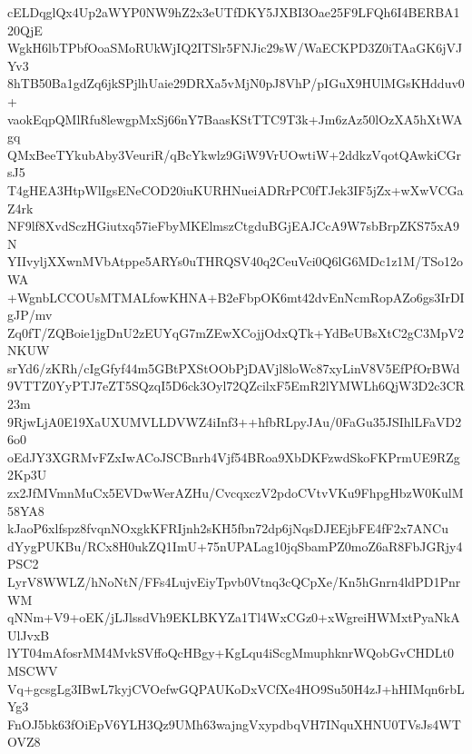 cELDqglQx4Up2aWYP0NW9hZ2x3eUTfDKY5JXBI3Oae25F9LFQh6I4BERBA120QjE
WgkH6lbTPbfOoaSMoRUkWjIQ2ITSlr5FNJic29sW/WaECKPD3Z0iTAaGK6jVJYv3
8hTB50Ba1gdZq6jkSPjlhUaie29DRXa5vMjN0pJ8VhP/pIGuX9HUlMGsKHdduv0+
vaokEqpQMlRfu8lewgpMxSj66nY7BaasKStTTC9T3k+Jm6zAz50lOzXA5hXtWAgq
QMxBeeTYkubAby3VeuriR/qBcYkwlz9GiW9VrUOwtiW+2ddkzVqotQAwkiCGrsJ5
T4gHEA3HtpWlIgsENeCOD20iuKURHNueiADRrPC0fTJek3IF5jZx+wXwVCGaZ4rk
NF9lf8XvdSczHGiutxq57ieFbyMKElmszCtgduBGjEAJCcA9W7sbBrpZKS75xA9N
YIIvyljXXwnMVbAtppe5ARYs0uTHRQSV40q2CeuVci0Q6lG6MDc1z1M/TSo12oWA
+WgnbLCCOUsMTMALfowKHNA+B2eFbpOK6mt42dvEnNcmRopAZo6gs3IrDIgJP/mv
Zq0fT/ZQBoie1jgDnU2zEUYqG7mZEwXCojjOdxQTk+YdBeUBsXtC2gC3MpV2NKUW
srYd6/zKRh/cIgGfyf44m5GBtPXStOObPjDAVjl8loWc87xyLinV8V5EfPfOrBWd
9VTTZ0YyPTJ7eZT5SQzqI5D6ck3Oyl72QZcilxF5EmR2lYMWLh6QjW3D2c3CR23m
9RjwLjA0E19XaUXUMVLLDVWZ4iInf3++hfbRLpyJAu/0FaGu35JSIhlLFaVD26o0
oEdJY3XGRMvFZxIwACoJSCBnrh4Vjf54BRoa9XbDKFzwdSkoFKPrmUE9RZg2Kp3U
zx2JfMVmnMuCx5EVDwWerAZHu/CvcqxczV2pdoCVtvVKu9FhpgHbzW0KulM58YA8
kJaoP6xlfspz8fvqnNOxgkKFRIjnh2sKH5fbn72dp6jNqsDJEEjbFE4fF2x7ANCu
dYygPUKBu/RCx8H0ukZQ1ImU+75nUPALag10jqSbamPZ0moZ6aR8FbJGRjy4PSC2
LyrV8WWLZ/hNoNtN/FFs4LujvEiyTpvb0Vtnq3cQCpXe/Kn5hGnrn4ldPD1PnrWM
qNNm+V9+oEK/jLJlssdVh9EKLBKYZa1Tl4WxCGz0+xWgreiHWMxtPyaNkAUlJvxB
lYT04mAfosrMM4MvkSVffoQcHBgy+KgLqu4iScgMmuphknrWQobGvCHDLt0MSCWV
Vq+gcsgLg3IBwL7kyjCVOefwGQPAUKoDxVCfXe4HO9Su50H4zJ+hHIMqn6rbLYg3
FnOJ5bk63fOiEpV6YLH3Qz9UMh63wajngVxypdbqVH7INquXHNU0TVsJs4WTOVZ8
